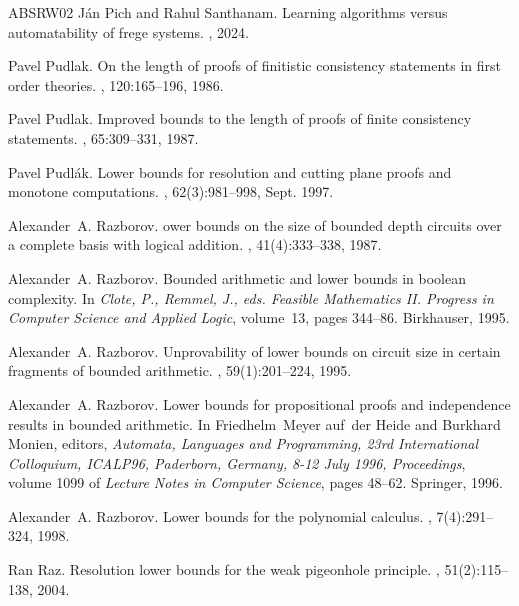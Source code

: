 \documentclass[11pt,letter]{article}
\theoremstyle{remark} %
\begin{document}
{\begin{thebibliography}{ABSRW02}
J\'{a}n Pich and Rahul Santhanam.
\newblock Learning algorithms versus automatability of frege systems.
, 2024.

Pavel Pudlak.
\newblock On the length of proofs of finitistic consistency statements in first order theories.
, 120:165--196, 1986.

Pavel Pudlak.
\newblock Improved bounds to the length of proofs of finite consistency statements.
, 65:309--331, 1987.

Pavel Pudl{\'a}k.
\newblock Lower bounds for resolution and cutting plane proofs and monotone computations.
, 62(3):981--998, Sept. 1997.

Alexander~A. Razborov.
ower bounds on the size of bounded depth circuits over a complete basis with logical addition.
, 41(4):333--338, 1987.

Alexander~A. Razborov.
\newblock Bounded arithmetic and lower bounds in boolean complexity.
\newblock In {\em Clote, P., Remmel, J., eds. Feasible Mathematics II. Progress in Computer Science and Applied Logic}, volume~13, pages 344--86. Birkhauser, 1995.

Alexander~A. Razborov.
\newblock Unprovability of lower bounds on circuit size in certain fragments of bounded arithmetic.
, 59(1):201--224, 1995.

Alexander~A. Razborov.
\newblock Lower bounds for propositional proofs and independence results in bounded arithmetic.
\newblock In Friedhelm~Meyer auf~der Heide and Burkhard Monien, editors, {\em Automata, Languages and Programming, 23rd International Colloquium, ICALP96, Paderborn, Germany, 8-12 July 1996, Proceedings}, volume 1099 of {\em Lecture Notes in Computer Science}, pages 48--62. Springer, 1996.

Alexander~A. Razborov.
\newblock Lower bounds for the polynomial calculus.
, 7(4):291--324, 1998.

Ran Raz.
\newblock Resolution lower bounds for the weak pigeonhole principle.
, 51(2):115--138, 2004.


\end{thebibliography}}
\end{document}
